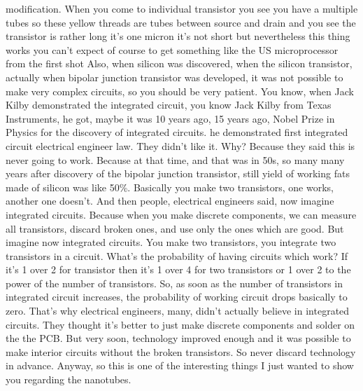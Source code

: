 modification. When you come to individual transistor you see you have a multiple tubes so these yellow threads are tubes between source and drain and you see the transistor is rather long it's one micron it's not short but nevertheless this thing works you can't expect of course to get something like the US microprocessor from the first shot Also, when silicon was discovered, when the silicon transistor, actually when bipolar junction transistor was developed, it was not possible to make very complex circuits, so you should be very patient. You know, when Jack Kilby demonstrated the integrated circuit, you know Jack Kilby from Texas Instruments, he got, maybe it was 10 years ago, 15 years ago, Nobel Prize in Physics for the discovery of integrated circuits. he demonstrated first integrated circuit electrical engineer law. They didn't like it. Why? Because they said this is never going to work. Because at that time, and that was in 50s, so many many years after discovery of the bipolar junction transistor, still yield of working fats made of silicon was like 50\%. Basically you make two transistors, one works, another one doesn't. And then people, electrical engineers said, now imagine integrated circuits. Because when you make discrete components, we can measure all transistors, discard broken ones, and use only the ones which are good. But imagine now integrated circuits. You make two transistors, you integrate two transistors in a circuit. What's the probability of having circuits which work? If it's 1 over 2 for transistor then it's 1 over 4 for two transistors or 1 over 2 to the power of the number of transistors. So, as soon as the number of transistors in integrated circuit increases, the probability of working circuit drops basically to zero. That's why electrical engineers, many, didn't actually believe in integrated circuits. They thought it's better to just make discrete components and solder on the the PCB. But very soon, technology improved enough and it was possible to make interior circuits without the broken transistors. So never discard technology in advance. Anyway, so this is one of the interesting things I just wanted to show you regarding the nanotubes.
